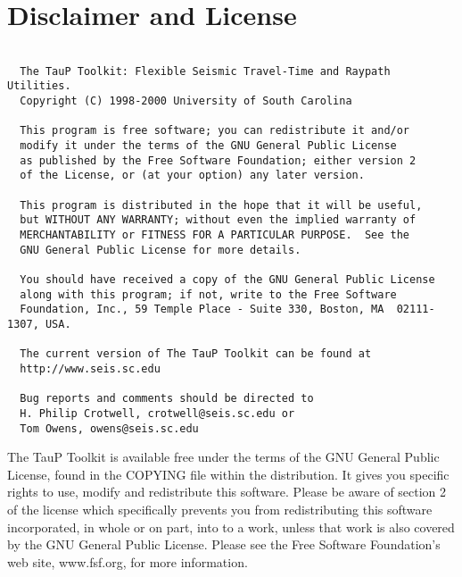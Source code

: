 
\section*{Disclaimer and License}
\begin{verbatim}

  The TauP Toolkit: Flexible Seismic Travel-Time and Raypath Utilities.
  Copyright (C) 1998-2000 University of South Carolina

  This program is free software; you can redistribute it and/or
  modify it under the terms of the GNU General Public License
  as published by the Free Software Foundation; either version 2
  of the License, or (at your option) any later version.

  This program is distributed in the hope that it will be useful,
  but WITHOUT ANY WARRANTY; without even the implied warranty of
  MERCHANTABILITY or FITNESS FOR A PARTICULAR PURPOSE.  See the
  GNU General Public License for more details.

  You should have received a copy of the GNU General Public License
  along with this program; if not, write to the Free Software
  Foundation, Inc., 59 Temple Place - Suite 330, Boston, MA  02111-1307, USA.

  The current version of The TauP Toolkit can be found at 
  http://www.seis.sc.edu

  Bug reports and comments should be directed to 
  H. Philip Crotwell, crotwell@seis.sc.edu or
  Tom Owens, owens@seis.sc.edu

\end{verbatim}

The TauP Toolkit is available free under the terms of the GNU General Public 
License, found in the COPYING file within the distribution. It gives you 
specific rights to use, modify and redistribute this software. Please be
aware of section 2 of the license which specifically prevents you from 
redistributing this software incorporated, in whole
or on part, into to a work, unless that work is also covered by the 
GNU General Public License. Please see the Free Software Foundation's
web site, www.fsf.org, for more information.

